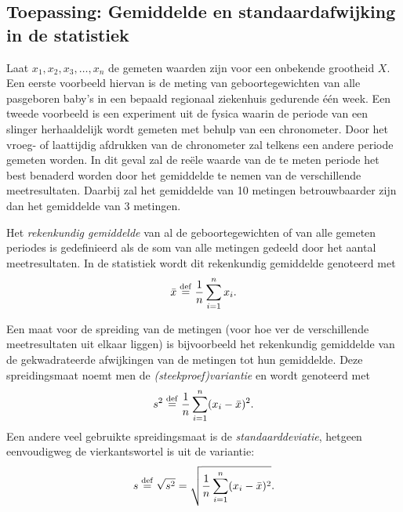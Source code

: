 \documentclass{ximera}
\begin{document}
\subsection{Toepassing: Gemiddelde en standaardafwijking in de statistiek}
Laat $x_1, x_2, x_3, \ldots , x_n$ de gemeten waarden zijn voor
een onbekende grootheid $X$. Een eerste voorbeeld hiervan is de
meting van geboortegewichten van alle pasgeboren baby's in een
bepaald regionaal ziekenhuis gedurende \'{e}\'{e}n week. Een
tweede voorbeeld is een experiment uit de fysica waarin de periode
van een slinger herhaaldelijk wordt gemeten met behulp van een
chronometer. Door het vroeg- of laattijdig afdrukken van de
chronometer zal telkens een andere periode gemeten worden. In dit
geval zal de re\"{e}le waarde van de te meten periode het best
benaderd worden door het gemiddelde te nemen van de verschillende
meetresultaten. Daarbij zal het gemiddelde van 10 metingen
betrouwbaarder zijn dan het gemiddelde van 3 metingen.

Het \emph{rekenkundig gemiddelde} van al de geboortegewichten of
van alle gemeten periodes is gedefinieerd als de som van alle
metingen gedeeld door het aantal meetresultaten. In de statistiek
wordt dit rekenkundig gemiddelde genoteerd met
\[\bar{x}\overset{\mathrm{def}}{=}\frac{1}{n}\sum_{i=1}^{n} x_{i}.\]

Een maat voor de spreiding van de metingen (voor hoe ver de
verschillende meetresultaten uit elkaar liggen) is bijvoorbeeld
het rekenkundig gemiddelde van de gekwadrateerde afwijkingen van
de metingen tot hun gemiddelde. Deze spreidingsmaat noemt men de
\emph{(steekproef)variantie} en wordt genoteerd met
\[s^2\overset{\mathrm{def}}{=}\frac{1}{n}\sum^{n}_{i=1}(x_i-\bar{x})^2.\]
Een andere veel gebruikte spreidingsmaat is de
\emph{standaarddeviatie}, hetgeen eenvoudigweg de vierkantswortel
is uit de variantie:
\[s\overset{\mathrm{def}}{=}\sqrt{s^2}=\sqrt{\frac{1}{n}\sum^{n}_{i=1}(x_i-\bar{x})^2}. \]
\end{document}
